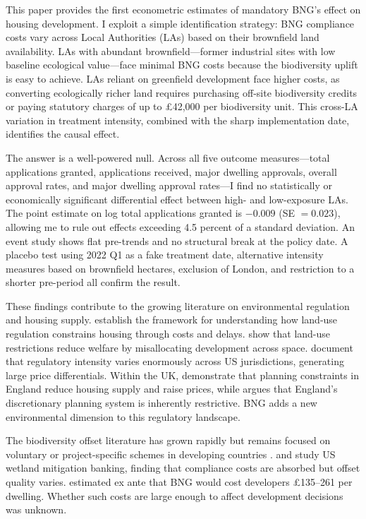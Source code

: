 \documentclass[12pt]{article}
\begin{document}
This paper provides the first econometric estimates of mandatory BNG's effect on housing development. I exploit a simple identification strategy: BNG compliance costs vary across Local Authorities (LAs) based on their brownfield land availability. LAs with abundant brownfield---former industrial sites with low baseline ecological value---face minimal BNG costs because the biodiversity uplift is easy to achieve. LAs reliant on greenfield development face higher costs, as converting ecologically richer land requires purchasing off-site biodiversity credits or paying statutory charges of up to \pounds42,000 per biodiversity unit. This cross-LA variation in treatment intensity, combined with the sharp implementation date, identifies the causal effect.

The answer is a well-powered null. Across all five outcome measures---total applications granted, applications received, major dwelling approvals, overall approval rates, and major dwelling approval rates---I find no statistically or economically significant differential effect between high- and low-exposure LAs. The point estimate on log total applications granted is $-0.009$ (SE $= 0.023$), allowing me to rule out effects exceeding 4.5 percent of a standard deviation. An event study shows flat pre-trends and no structural break at the policy date. A placebo test using 2022 Q1 as a fake treatment date, alternative intensity measures based on brownfield hectares, exclusion of London, and restriction to a shorter pre-period all confirm the result.

These findings contribute to the growing literature on environmental regulation and housing supply. \citet{Glaeser2009} establish the framework for understanding how land-use regulation constrains housing through costs and delays. \citet{Turner2014} show that land-use restrictions reduce welfare by misallocating development across space. \citet{Gyourko2019} document that regulatory intensity varies enormously across US jurisdictions, generating large price differentials. Within the UK, \citet{Hilber2016} demonstrate that planning constraints in England reduce housing supply and raise prices, while \citet{Cheshire2018} argues that England's discretionary planning system is inherently restrictive. BNG adds a new environmental dimension to this regulatory landscape.

The biodiversity offset literature has grown rapidly but remains focused on voluntary or project-specific schemes in developing countries \citep{Bull2013, Maron2016}. \citet{McKenney2005} and \citet{BenDor2015} study US wetland mitigation banking, finding that compliance costs are absorbed but offset quality varies. \citet{DEFRA2023} estimated ex ante that BNG would cost developers \pounds135--261 per dwelling. Whether such costs are large enough to affect development decisions was unknown.
\end{document}
